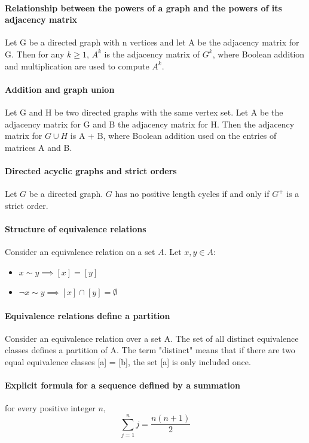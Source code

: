 \documentclass[a4paper]{article}
\begin{document}
\paragraph{Relationship between the powers of a graph and the powers of its adjacency matrix}
Let G be a directed graph with n vertices and let A be the adjacency matrix for G. Then for any $k \geq 1$, $A^k$ is the adjacency matrix of $G^k$, where Boolean addition and multiplication are used to compute $A^k$.
\paragraph{Addition and graph union}
Let G and H be two directed graphs with the same vertex set. Let A be the adjacency matrix for G and B the adjacency matrix for H. Then the adjacency matrix for $G \cup H$ is A + B, where Boolean addition used on the entries of matrices A and B. 
\paragraph{Directed acyclic graphs and strict orders}
Let $G$ be a directed graph. $G$ has no positive length cycles if and only if $G^+$ is a strict order.
\paragraph{Structure of equivalence relations}
Consider an equivalence relation on a set $A$. Let $x,y \in A$:
\begin{itemize}
  \item $x \sim y \implies [x] = [y]$
  \item $\lnot x \sim y \implies [x] \cap [y] = \emptyset$
\end{itemize}
\paragraph{Equivalence relations define a partition}
Consider an equivalence relation over a set A. The set of all distinct equivalence classes defines a partition of A. The term "distinct" means that if there are two equal equivalence classes [a] = [b], the set [a] is only included once.
\paragraph{Explicit formula for a sequence defined by a summation}
for every positive integer $n$, 
\begin{equation*}
  \sum_{j = 1}^{n} j = \frac{n(n + 1)}{2} 
\end{equation*}
\end{document}
